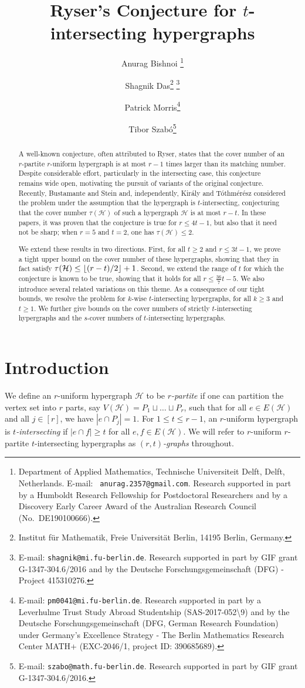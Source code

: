 \documentclass[a4paper,twoside,11pt]{article}
\title{Ryser's Conjecture for $t$-intersecting hypergraphs}
\author{Anurag Bishnoi
        \thanks{Department of Applied Mathematics, Technische Universiteit Delft, Delft, Netherlands.
        E-mail: {\tt
        anurag.2357@gmail.com}. Research supported in part by a Humboldt Research Fellowship for Postdoctoral Researchers and by a Discovery Early Career Award of the Australian Research Council (No.~DE190100666).}
    \and
        Shagnik Das\thanks{Institut f\"ur Mathematik, Freie Universit\"at Berlin, 14195 Berlin, Germany.}
        \thanks{E-mail: {\tt shagnik@mi.fu-berlin.de}. Research supported in part by GIF grant G-1347-304.6/2016 and by the Deutsche Forschungsgemeinschaft (DFG) - Project 415310276.}
    \and
        Patrick Morris\footnotemark[2]
        \thanks{E-mail: {\tt pm0041@mi.fu-berlin.de}. Research supported in part by a Leverhulme Trust Study Abroad Studentship (SAS-2017-052\textbackslash 9) and by the Deutsche Forschungsgemeinschaft (DFG, German Research
Foundation) under Germany's Excellence Strategy - The Berlin Mathematics
Research Center MATH+ (EXC-2046/1, project ID: 390685689).}
    \and
        Tibor Szab\'{o}\footnotemark[2]
        \thanks{E-mail: {\tt szabo@math.fu-berlin.de}. Research supported in part by GIF grant G-1347-304.6/2016.}}
\DeclarePairedDelimiter{\floor}{\lfloor}{\rfloor}
\numberwithin{thm}{section}
\theoremstyle{definition}
\theoremstyle{remark}
\theoremstyle{definition}
\newcommand{\mc}[1]{\mathcal{#1}}
\def\cH{{\mathcal H}}
\newcommand{\m}[1]{\mathcal{#1}}
\begin{document}
\maketitle

\begin{abstract}
A well-known conjecture, often attributed to Ryser, states that the cover number of an $r$-partite $r$-uniform hypergraph is at most $r - 1$ times larger than its matching number.  Despite considerable effort, particularly in the intersecting case, this conjecture remains wide open, motivating the pursuit of variants of the original conjecture.  Recently, Bustamante and Stein and, independently, Kir\'{a}ly and T\'{o}thm\'{e}r\'{e}sz  considered the problem under the assumption that the hypergraph is $t$-intersecting, conjecturing that the cover number $\tau(\m H)$ of such a hypergraph $\m H$ is at most $r - t$.  In these papers, it was proven that the conjecture is true for $r \leq 4t-1$, but also that it need not be sharp; when $r = 5$ and $t = 2$, one has $\tau(\mc H) \le 2$.

We extend these results in two directions. First, for all $t \ge 2$ and $r \le 3t-1$, we prove a tight upper bound on the cover number of these hypergraphs, showing that they in fact satisfy $\tau(\m H) \leq \floor{(r - t)/2} + 1$. Second, we extend the range of $t$ for which the conjecture is known to be true, showing that it holds for all $r \le \frac{36}{7}t-5$. 
We also introduce several related variations on this theme.  As a consequence of our tight bounds, we resolve the problem for $k$-wise $t$-intersecting hypergraphs, for all $k \ge 3$ and $t \ge 1$.  We further give bounds on the cover numbers of strictly $t$-intersecting hypergraphs and the $s$-cover numbers of $t$-intersecting hypergraphs.
\end{abstract}

\section{Introduction}
We define an $r$-uniform hypergraph $\cH$ to be \emph{$r$-partite} if one can partition the vertex set into $r$ parts, say $V(\cH)= P_1\sqcup \dots \sqcup P_r$, such that for all $e\in E(\cH)$ and all $j\in [r]$, we have $|e\cap P_j|=1$. For $1 \leq t \leq r-1$,  an $r$-uniform hypergraph is  \emph{$t$-intersecting} if $|e\cap f|\ge t$ for all $e,f\in E(\cH)$. We will refer to $r$-uniform $r$-partite $t$-intersecting hypergraphs as \emph{$(r,t)$-graphs} throughout. 
\end{document}
